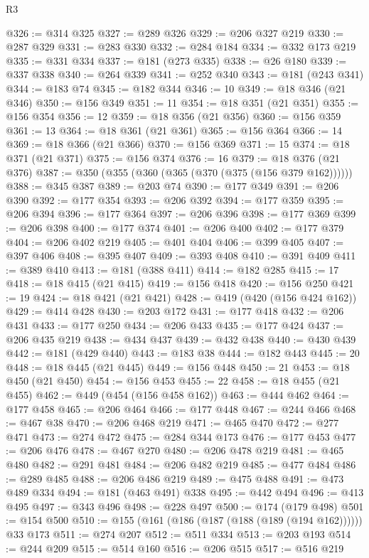 \begin{lexlean}{R3}
\begin{coremodule}
@326 := @314 @325
@327 := @289 @326
@329 := @206 @327 @219
@330 := @287 @329
@331 := @283 @330
@332 := @284 @184
@334 := @332 @173 @219
@335 := @331 @334
@337 := @181 (@273 @335)
@338 := @26 @180
@339 := @337 @338
@340 := @264 @339
@341 := @252 @340
@343 := @181 (@243 @341)
@344 := @183 @74
@345 := @182 @344
@346 := 10
@349 := @18 @346 (@21 @346)
@350 := @156 @349
@351 := 11
@354 := @18 @351 (@21 @351)
@355 := @156 @354
@356 := 12
@359 := @18 @356 (@21 @356)
@360 := @156 @359
@361 := 13
@364 := @18 @361 (@21 @361)
@365 := @156 @364
@366 := 14
@369 := @18 @366 (@21 @366)
@370 := @156 @369
@371 := 15
@374 := @18 @371 (@21 @371)
@375 := @156 @374
@376 := 16
@379 := @18 @376 (@21 @376)
@387 := @350 (@355 (@360 (@365 (@370 (@375 (@156 @379 @162))))))
@388 := @345 @387
@389 := @203 @74
@390 := @177 @349
@391 := @206 @390
@392 := @177 @354
@393 := @206 @392
@394 := @177 @359
@395 := @206 @394
@396 := @177 @364
@397 := @206 @396
@398 := @177 @369
@399 := @206 @398
@400 := @177 @374
@401 := @206 @400
@402 := @177 @379
@404 := @206 @402 @219
@405 := @401 @404
@406 := @399 @405
@407 := @397 @406
@408 := @395 @407
@409 := @393 @408
@410 := @391 @409
@411 := @389 @410
@413 := @181 (@388 @411)
@414 := @182 @285
@415 := 17
@418 := @18 @415 (@21 @415)
@419 := @156 @418
@420 := @156 @250
@421 := 19
@424 := @18 @421 (@21 @421)
@428 := @419 (@420 (@156 @424 @162))
@429 := @414 @428
@430 := @203 @172
@431 := @177 @418
@432 := @206 @431
@433 := @177 @250
@434 := @206 @433
@435 := @177 @424
@437 := @206 @435 @219
@438 := @434 @437
@439 := @432 @438
@440 := @430 @439
@442 := @181 (@429 @440)
@443 := @183 @38
@444 := @182 @443
@445 := 20
@448 := @18 @445 (@21 @445)
@449 := @156 @448
@450 := 21
@453 := @18 @450 (@21 @450)
@454 := @156 @453
@455 := 22
@458 := @18 @455 (@21 @455)
@462 := @449 (@454 (@156 @458 @162))
@463 := @444 @462
@464 := @177 @458
@465 := @206 @464
@466 := @177 @448
@467 := @244 @466
@468 := @467 @38
@470 := @206 @468 @219
@471 := @465 @470
@472 := @277 @471
@473 := @274 @472
@475 := @284 @344 @173
@476 := @177 @453
@477 := @206 @476
@478 := @467 @270
@480 := @206 @478 @219
@481 := @465 @480
@482 := @291 @481
@484 := @206 @482 @219
@485 := @477 @484
@486 := @289 @485
@488 := @206 @486 @219
@489 := @475 @488
@491 := @473 @489 @334
@494 := @181 (@463 @491) @338
@495 := @442 @494
@496 := @413 @495
@497 := @343 @496
@498 := @228 @497
@500 := @174 (@179 @498)
@501 := @154 @500
@510 := @155 (@161 (@186 (@187 (@188 (@189 (@194 @162)))))) @33 @173
@511 := @274 @207
@512 := @511 @334
@513 := @203 @193
@514 := @244 @209
@515 := @514 @160
@516 := @206 @515
@517 := @516 @219

\end{coremodule}
\end{lexlean}
